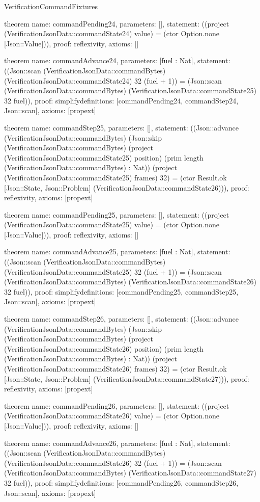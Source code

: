 \begin{lexlean}{VerificationCommandFixtures}
\begin{semanticmodule}
theorem{
  name: commandPending24,
  parameters: [],
  statement: ((project (VerificationJsonData::commandState24) value) = (ctor Option.none [Json::Value])),
  proof: reflexivity{},
  axioms: []
}

theorem{
  name: commandAdvance24,
  parameters: [fuel : Nat],
  statement: ((Json::scan (VerificationJsonData::commandBytes) (VerificationJsonData::commandState24) 32 (fuel + 1)) = (Json::scan (VerificationJsonData::commandBytes) (VerificationJsonData::commandState25) 32 fuel)),
  proof: simplify{definitions: [commandPending24, commandStep24, Json::scan]},
  axioms: [propext]
}

theorem{
  name: commandStep25,
  parameters: [],
  statement: ((Json::advance (VerificationJsonData::commandBytes) (Json::skip (VerificationJsonData::commandBytes) (project (VerificationJsonData::commandState25) position) (prim length (VerificationJsonData::commandBytes) : Nat)) (project (VerificationJsonData::commandState25) frames) 32) = (ctor Result.ok [Json::State, Json::Problem] (VerificationJsonData::commandState26))),
  proof: reflexivity{},
  axioms: [propext]
}

theorem{
  name: commandPending25,
  parameters: [],
  statement: ((project (VerificationJsonData::commandState25) value) = (ctor Option.none [Json::Value])),
  proof: reflexivity{},
  axioms: []
}

theorem{
  name: commandAdvance25,
  parameters: [fuel : Nat],
  statement: ((Json::scan (VerificationJsonData::commandBytes) (VerificationJsonData::commandState25) 32 (fuel + 1)) = (Json::scan (VerificationJsonData::commandBytes) (VerificationJsonData::commandState26) 32 fuel)),
  proof: simplify{definitions: [commandPending25, commandStep25, Json::scan]},
  axioms: [propext]
}

theorem{
  name: commandStep26,
  parameters: [],
  statement: ((Json::advance (VerificationJsonData::commandBytes) (Json::skip (VerificationJsonData::commandBytes) (project (VerificationJsonData::commandState26) position) (prim length (VerificationJsonData::commandBytes) : Nat)) (project (VerificationJsonData::commandState26) frames) 32) = (ctor Result.ok [Json::State, Json::Problem] (VerificationJsonData::commandState27))),
  proof: reflexivity{},
  axioms: [propext]
}

theorem{
  name: commandPending26,
  parameters: [],
  statement: ((project (VerificationJsonData::commandState26) value) = (ctor Option.none [Json::Value])),
  proof: reflexivity{},
  axioms: []
}

theorem{
  name: commandAdvance26,
  parameters: [fuel : Nat],
  statement: ((Json::scan (VerificationJsonData::commandBytes) (VerificationJsonData::commandState26) 32 (fuel + 1)) = (Json::scan (VerificationJsonData::commandBytes) (VerificationJsonData::commandState27) 32 fuel)),
  proof: simplify{definitions: [commandPending26, commandStep26, Json::scan]},
  axioms: [propext]
}


\end{semanticmodule}
\end{lexlean}
